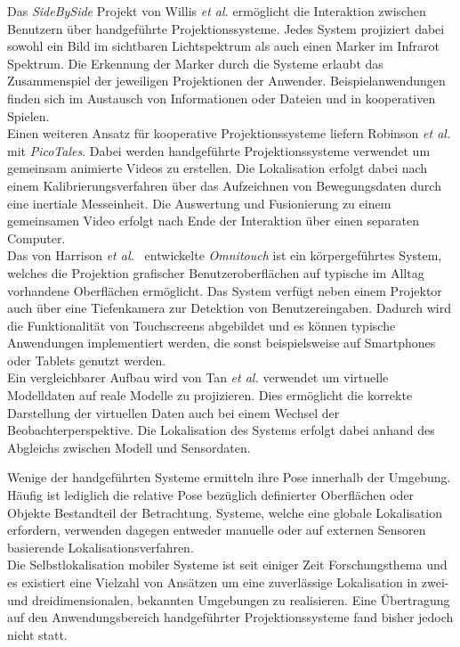 Das \textit{SideBySide} Projekt von Willis \textit{et al.} \cite{Willis2011} ermöglicht die Interaktion zwischen Benutzern über handgeführte Projektionssysteme. Jedes System projiziert dabei sowohl ein Bild im sichtbaren Lichtspektrum als auch einen Marker im Infrarot Spektrum. Die Erkennung der Marker durch die Systeme erlaubt das Zusammenspiel der jeweiligen Projektionen der Anwender. Beispielanwendungen finden sich im Austausch von Informationen oder Dateien und in kooperativen Spielen.\\
Einen weiteren Ansatz für kooperative Projektionssysteme liefern Robinson \textit{et al.} \cite{Robinson2012} mit \textit{PicoTales}. Dabei werden handgeführte Projektionssysteme verwendet um gemeinsam animierte Videos zu erstellen. Die Lokalisation erfolgt dabei nach einem Kalibrierungsverfahren über das Aufzeichnen von Bewegungsdaten durch eine inertiale Messeinheit. Die Auswertung und Fusionierung zu einem gemeinsamen Video erfolgt nach Ende der Interaktion über einen separaten Computer.\\

Das von Harrison \textit{et al.\ }\cite{Harrison2011} entwickelte \textit{Omnitouch} ist ein körpergeführtes System, welches die Projektion grafischer Benutzeroberflächen auf typische im Alltag vorhandene Oberflächen ermöglicht. Das System verfügt neben einem Projektor auch über eine Tiefenkamera zur Detektion von Benutzereingaben. Dadurch wird die Funktionalität von Touchscreens abgebildet und es können typische Anwendungen implementiert werden, die sonst beispielsweise auf Smartphones oder Tablets genutzt werden.\\
Ein vergleichbarer Aufbau wird von Tan \textit{et al.} \cite{Tan2013} verwendet um virtuelle Modelldaten auf reale Modelle zu projizieren. Dies ermöglicht die korrekte Darstellung der virtuellen Daten auch bei einem Wechsel der Beobachterperspektive. Die Lokalisation des Systems erfolgt dabei anhand des Abgleichs zwischen Modell und Sensordaten.\\


Wenige der handgeführten Systeme ermitteln ihre Pose innerhalb der Umgebung. Häufig ist lediglich die relative Pose bezüglich definierter Oberflächen oder Objekte Bestandteil der Betrachtung. Systeme, welche eine globale Lokalisation erfordern, verwenden dagegen entweder manuelle oder auf externen Sensoren basierende Lokalisationsverfahren.\\
Die Selbstlokalisation mobiler Systeme ist seit einiger Zeit Forschungsthema und es existiert eine Vielzahl von Ansätzen um eine zuverlässige Lokalisation in zwei- und dreidimensionalen, bekannten Umgebungen zu realisieren. Eine Übertragung auf den Anwendungsbereich handgeführter Projektionssysteme fand bisher jedoch nicht statt.\\

